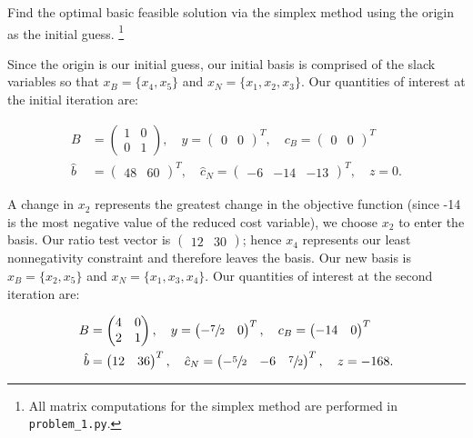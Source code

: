 Find the optimal basic feasible solution via the simplex method using the origin as the initial guess. \footnote{
  All matrix computations for the simplex method are performed in \texttt{problem\_1.py}.
}

\begin{solution}
  Since the origin is our initial guess, our initial basis is comprised of the slack variables so that 
  $x_B = \{ x_4, x_5 \}$ and $x_N = \{ x_1, x_2, x_3 \}$. Our quantities of interest at the initial iteration are:


  \begin{align*}
    B &= \begin{pmatrix}
      1 & 0 \\
      0 & 1
    \end{pmatrix}, \quad y = \begin{pmatrix}
      0 & 0
    \end{pmatrix}^T, \quad c_B = \begin{pmatrix}
      0 & 0
    \end{pmatrix}^T \\
    \hat{b} &= \begin{pmatrix}
      48 & 60
    \end{pmatrix}^T, \quad \hat{c}_N = \begin{pmatrix}
      -6 & -14 & -13
    \end{pmatrix}^T, \quad z = 0.
  \end{align*}

  A change in $x_2$ represents the greatest change in the objective function (since -14 is the most negative value of
  the reduced cost variable), we choose $x_2$ to enter the basis. Our ratio test vector 
  is $\begin{pmatrix} 12 & 30 \end{pmatrix}$; hence $x_4$ represents our least nonnegativity constraint and therefore 
  leaves the basis. Our new basis is $x_B = \{ x_2, x_5 \}$ and $x_N = \{ x_1, x_3, x_4 \}$. Our quantities of interest 
  at the second iteration are:

  \begin{align*}
    B &= \begin{pmatrix}
      4 & 0 \\
      2 & 1
    \end{pmatrix}, \quad y = \begin{pmatrix}
      -\sfrac{7}{2} & 0
    \end{pmatrix}^T, \quad c_B = \begin{pmatrix}
      -14 & 0
    \end{pmatrix}^T \\
    \hat{b} &= \begin{pmatrix}
      12 & 36
    \end{pmatrix}^T, \quad \hat{c}_N = \begin{pmatrix}
      -\sfrac{5}{2} & -6 & \sfrac{7}{2}
    \end{pmatrix}^T, \quad z = -168.
  \end{align*}


\end{solution}
